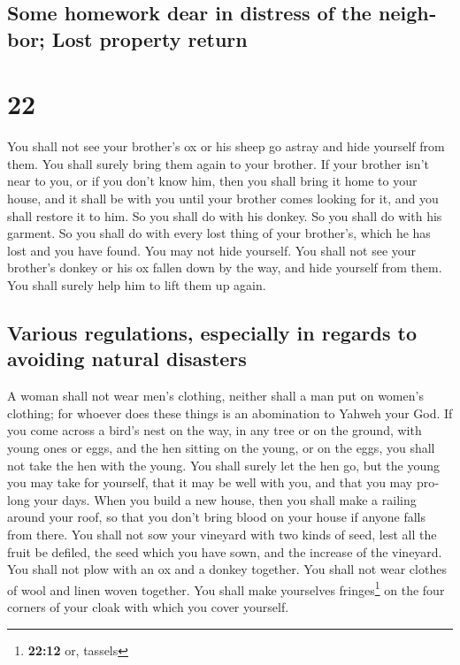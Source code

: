 \begin{paracol}{2}
\switchcolumn
\begin{otherlanguage}{english}

\hypertarget{some-homework-dear-in-distress-of-the-neighbor-lost-property-return}{%
\subsection{Some homework dear in distress of the neighbor; Lost
property
return}\label{some-homework-dear-in-distress-of-the-neighbor-lost-property-return}}

\hypertarget{section-43}{%
\section{22}\label{section-43}}

 You shall not see your brother's ox or his sheep go
astray and hide yourself from them. You shall surely bring them again to
your brother.  If your brother isn't near to you, or if
you don't know him, then you shall bring it home to your house, and it
shall be with you until your brother comes looking for it, and you shall
restore it to him.  So you shall do with his donkey. So
you shall do with his garment. So you shall do with every lost thing of
your brother's, which he has lost and you have found. You may not hide
yourself.  You shall not see your brother's donkey or his
ox fallen down by the way, and hide yourself from them. You shall surely
help him to lift them up again.

\hypertarget{various-regulations-especially-in-regards-to-avoiding-natural-disasters}{%
\subsection{Various regulations, especially in regards to avoiding
natural
disasters}\label{various-regulations-especially-in-regards-to-avoiding-natural-disasters}}

 A woman shall not wear men's clothing, neither shall a
man put on women's clothing; for whoever does these things is an
abomination to Yahweh your God.  If you come across a
bird's nest on the way, in any tree or on the ground, with young ones or
eggs, and the hen sitting on the young, or on the eggs, you shall not
take the hen with the young.  You shall surely let the hen
go, but the young you may take for yourself, that it may be well with
you, and that you may prolong your days.  When you build a
new house, then you shall make a railing around your roof, so that you
don't bring blood on your house if anyone falls from there.
 You shall not sow your vineyard with two kinds of seed,
lest all the fruit be defiled, the seed which you have sown, and the
increase of the vineyard.  You shall not plow with an ox
and a donkey together.  You shall not wear clothes of
wool and linen woven together.  You shall make yourselves
fringes\footnote{\textbf{22:12} or, tassels} on the four corners of your
cloak with which you cover yourself.


\end{otherlanguage}
\end{paracol}

